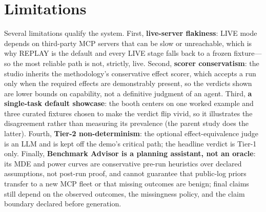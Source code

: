\section*{Limitations}
\label{sec:limitations}

Several limitations qualify the system. First, \textbf{live-server flakiness}:
LIVE mode depends on third-party MCP servers that can be slow or unreachable,
which is why REPLAY is the default and every LIVE stage falls back to a frozen
fixture---so the most reliable path is not, strictly, live. Second,
\textbf{scorer conservatism}: the studio inherits the methodology's conservative
effect scorer, which accepts a run only when the required effects are
demonstrably present, so the verdicts shown are lower bounds on capability, not
a definitive judgment of an agent. Third, \textbf{a single-task default
showcase}: the booth centers on one worked example and three curated fixtures
chosen to make the verdict flip vivid, so it illustrates the disagreement rather
than measuring its prevalence (the parent study does the latter). Fourth,
\textbf{Tier-2 non-determinism}: the optional effect-equivalence judge is an LLM
and is kept off the demo's critical path; the headline verdict is Tier-1 only.
Finally, \textbf{Benchmark Advisor is a planning assistant, not an oracle}: its
MDE and power curves are conservative pre-run heuristics over declared
assumptions, not post-run proof, and cannot guarantee that public-log priors
transfer to a new MCP fleet or that missing outcomes are benign; final claims
still depend on the observed outcomes, the missingness policy, and the claim
boundary declared before generation.
